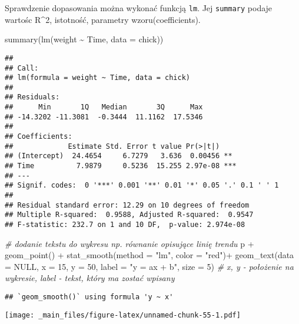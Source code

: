 \documentclass[
]{book}
\newenvironment{Shaded}{\begin{snugshade}}{\end{snugshade}}
\newcommand{\AttributeTok}[1]{\textcolor[rgb]{0.77,0.63,0.00}{#1}}
\newcommand{\CommentTok}[1]{\textcolor[rgb]{0.56,0.35,0.01}{\textit{#1}}}
\newcommand{\ConstantTok}[1]{\textcolor[rgb]{0.00,0.00,0.00}{#1}}
\newcommand{\DecValTok}[1]{\textcolor[rgb]{0.00,0.00,0.81}{#1}}
\newcommand{\FunctionTok}[1]{\textcolor[rgb]{0.00,0.00,0.00}{#1}}
\newcommand{\NormalTok}[1]{#1}
\newcommand{\SpecialCharTok}[1]{\textcolor[rgb]{0.00,0.00,0.00}{#1}}
\newcommand{\StringTok}[1]{\textcolor[rgb]{0.31,0.60,0.02}{#1}}
\begin{document}
Sprawdzenie dopasowania można wykonać funkcją \texttt{lm}. Jej \texttt{summary} podaje wartośc R\^{}2, istotność, parametry wzoru(coefficients).

\begin{Shaded}
\begin{Highlighting}[]
\FunctionTok{summary}\NormalTok{(}\FunctionTok{lm}\NormalTok{(weight }\SpecialCharTok{\textasciitilde{}}\NormalTok{ Time, }\AttributeTok{data =}\NormalTok{ chick))}
\end{Highlighting}
\end{Shaded}

\begin{verbatim}
## 
## Call:
## lm(formula = weight ~ Time, data = chick)
## 
## Residuals:
##      Min       1Q   Median       3Q      Max 
## -14.3202 -11.3081  -0.3444  11.1162  17.5346 
## 
## Coefficients:
##             Estimate Std. Error t value Pr(>|t|)    
## (Intercept)  24.4654     6.7279   3.636  0.00456 ** 
## Time          7.9879     0.5236  15.255 2.97e-08 ***
## ---
## Signif. codes:  0 '***' 0.001 '**' 0.01 '*' 0.05 '.' 0.1 ' ' 1
## 
## Residual standard error: 12.29 on 10 degrees of freedom
## Multiple R-squared:  0.9588, Adjusted R-squared:  0.9547 
## F-statistic: 232.7 on 1 and 10 DF,  p-value: 2.974e-08
\end{verbatim}

\begin{Shaded}
\begin{Highlighting}[]
\CommentTok{\# dodanie tekstu do wykresu np. równanie opisujące linię trendu}
\NormalTok{p }\SpecialCharTok{+} \FunctionTok{geom\_point}\NormalTok{() }\SpecialCharTok{+} \FunctionTok{stat\_smooth}\NormalTok{(}\AttributeTok{method =} \StringTok{"lm"}\NormalTok{, }\AttributeTok{color =} \StringTok{"red"}\NormalTok{)}\SpecialCharTok{+}
  \FunctionTok{geom\_text}\NormalTok{(}\AttributeTok{data =} \ConstantTok{NULL}\NormalTok{, }\AttributeTok{x =} \DecValTok{15}\NormalTok{, }\AttributeTok{y =} \DecValTok{50}\NormalTok{, }\AttributeTok{label =} \StringTok{"y = ax + b"}\NormalTok{, }\AttributeTok{size =} \DecValTok{5}\NormalTok{) }\CommentTok{\# x, y {-} położenie na wykresie, label {-} tekst, który ma zostać wpisany}
\end{Highlighting}
\end{Shaded}

\begin{verbatim}
## `geom_smooth()` using formula 'y ~ x'
\end{verbatim}

\texttt{[image: \_main\_files/figure-latex/unnamed-chunk-55-1.pdf]}
\end{document}
